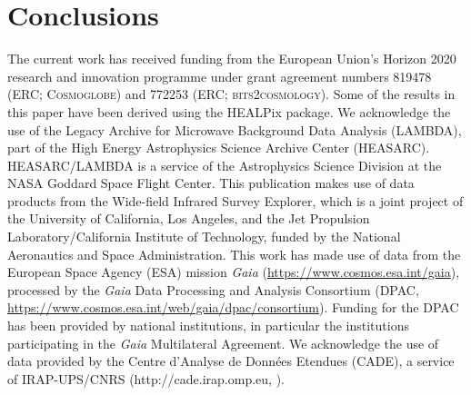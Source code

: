 \documentclass{aa}
\begin{document}
\clearpage
\section{Conclusions}
\label{sec:conclusions}




\blindtext





\begin{acknowledgements}
 The current work has received funding from the European
  Union’s Horizon 2020 research and innovation programme under grant
  agreement numbers 819478 (ERC; \textsc{Cosmoglobe}) and 772253 (ERC;
  \textsc{bits2cosmology}). Some of the results in this paper have been derived using the HEALPix \citep{healpix} package.
  We acknowledge the use of the Legacy Archive for Microwave Background Data
  Analysis (LAMBDA), part of the High Energy Astrophysics Science Archive Center
  (HEASARC). HEASARC/LAMBDA is a service of the Astrophysics Science Division at
  the NASA Goddard Space Flight Center.  
This publication makes use of data products from the Wide-field Infrared Survey
Explorer, which is a joint project of the University of California, Los
Angeles, and the Jet Propulsion Laboratory/California Institute of Technology,
funded by the National Aeronautics and Space Administration.
This work has made use of data from the European Space Agency (ESA) mission
{\it Gaia} (\url{https://www.cosmos.esa.int/gaia}), processed by the {\it Gaia}
Data Processing and Analysis Consortium (DPAC,
\url{https://www.cosmos.esa.int/web/gaia/dpac/consortium}). Funding for the DPAC
has been provided by national institutions, in particular the institutions
participating in the {\it Gaia} Multilateral Agreement.
	We acknowledge the use of data provided by the Centre d'Analyse de Données Etendues (CADE), a service of IRAP-UPS/CNRS (http://cade.irap.omp.eu, \citealt{paradis:2012}). 
\end{acknowledgements}


%



\end{document}
